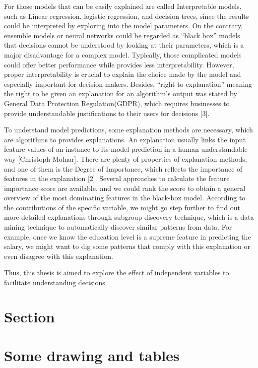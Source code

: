 \documentclass{CSSHThesis}
\begin{document}
For those models that can be easily explained are called Interpretable models, such as Linear regression, logistic regression, and decision trees, since the results could be interpreted by exploring into the model parameters. On the contrary, ensemble models or neural networks could be regarded as “black box” models that decisions cannot be understood by looking at their parameters, which is a major disadvantage for a complex model. Typically, those complicated models could offer better performance while provides less interpretability. However, proper interpretability is crucial to explain the choice made by the model and especially important for decision makers. Besides, “right to explanation” meaning the right to be given an explanation for an algorithm’s output was stated by General Data Protection Regulation(GDPR), which requires businesses to provide understandable justifications to their users for decisions [3].

To understand model predictions, some explanation methods are necessary, which are algorithms to provides explanations. An explanation usually links the input feature values of an instance to its model prediction in a human understandable way [Christoph Molnar]. There are plenty of properties of explanation methods, and one of them is the Degree of Importance, which reflects the importance of features in the explanation [2]. Several approaches to calculate the feature importance score are available, and we could rank the score to obtain a general overview of the most dominating features in the black-box model. According to the contributions of the specific variable, we might go step further to find out more detailed explanations through subgroup discovery technique, which is a data mining technique to automatically discover similar patterns from data. For example, once we know the education level is a supreme feature in predicting the salary, we might want to dig some patterns that comply with this explanation or even disagree with this explanation.  

Thus, this thesis is aimed to explore the effect of independent variables to facilitate understanding decisions. 
\section{Section}


\section{Some drawing and tables}



\printbibliography
\end{document}
